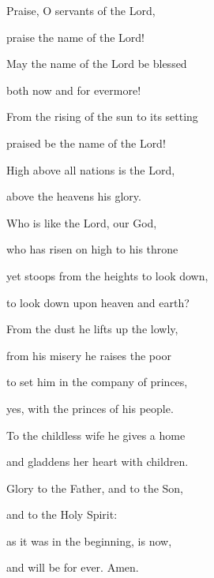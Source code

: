 \noindent Praise, O servants of the Lord,~\GreStar{}~\nopagebreak

praise the name of the Lord!

\noindent May the name of the Lord be blessed~\GreStar{}~\nopagebreak

both now and for evermore!

\noindent From the rising of the sun to its setting~\GreStar{}~\nopagebreak

praised be the name of the Lord!

\noindent High above all nations is the Lord,~\GreStar{}~\nopagebreak

above the heavens his glory.

\noindent Who is like the Lord, our God,~\GreStar{}~\nopagebreak

who has risen on high to his throne

\noindent yet stoops from the heights to look down,~\GreStar{}~\nopagebreak

to look down upon heaven and earth?

\noindent From the dust he lifts up the lowly,~\GreStar{}~\nopagebreak

from his misery he raises the poor

\noindent to set him in the company of princes,~\GreStar{}~\nopagebreak

yes, with the princes of his people.

\noindent To the childless wife he gives a home~\GreStar{}~\nopagebreak

and gladdens her heart with children.

\noindent Glory to the Father, and to the Son,~\GreStar{}~\nopagebreak

and to the Holy Spirit:

\noindent as it was in the beginning, is now,~\GreStar{}~\nopagebreak

and will be for ever. Amen.
